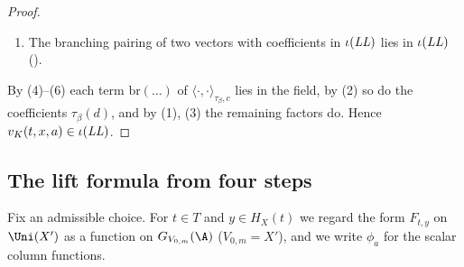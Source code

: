 \begin{proof}
\begin{enumerate}[label=(\arabic*)]
(), and the row map
$\mathrm{J}^{\mathrm{row}}_d(\mathrm{pt}(c))$ preserves this property ().
\item The branching pairing of two vectors with coefficients in $\iota(\mathit{LL})$ lies in $\iota(\mathit{LL})$
().
\end{enumerate}
By (4)--(6) each term $\mathrm{br}(\dots)$ of $\langle\cdot,\cdot\rangle_{\tau_\beta,c}$ lies in the field, by (2) so do
the coefficients $\tau_\beta(d)$, and by (1), (3) the remaining factors do. Hence $v_K(t,x,a)\in\iota(\mathit{LL})$.
\end{proof}

\subsection{The lift formula from four steps}\label{sec:pf:rowprops:formula}

Fix an admissible choice. For $t\in T$ and $y\in H_X(t)$ we regard the form $F_{t,y}$ on $\Uni(X')$ as a function on
$G_{V_{0,m}}(\A)$ ($V_{0,m}=X'$), and we write $\phi_a$ for the scalar column functions.

